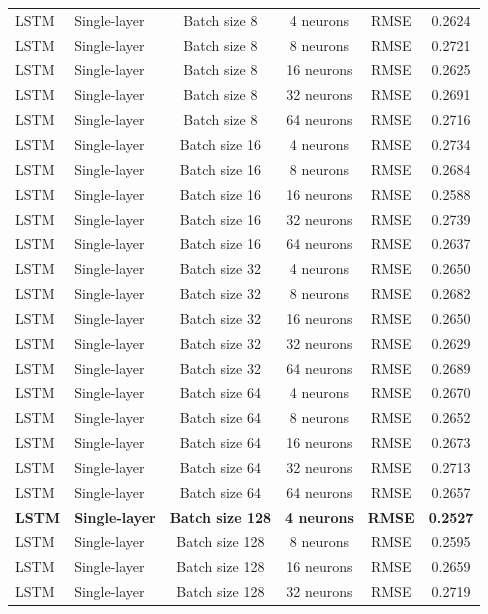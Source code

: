 \begin{landscape}
\begin{longtable}{llcccc}
LSTM & Single-layer & Batch size 8   & 4 neurons  & RMSE & 0.2624 \\
LSTM & Single-layer & Batch size 8   & 8 neurons  & RMSE & 0.2721 \\
LSTM & Single-layer & Batch size 8   & 16 neurons & RMSE & 0.2625 \\
LSTM & Single-layer & Batch size 8   & 32 neurons & RMSE & 0.2691 \\
LSTM & Single-layer & Batch size 8   & 64 neurons & RMSE & 0.2716 \\
LSTM & Single-layer & Batch size 16  & 4 neurons  & RMSE & 0.2734 \\
LSTM & Single-layer & Batch size 16  & 8 neurons  & RMSE & 0.2684 \\
LSTM & Single-layer & Batch size 16  & 16 neurons & RMSE & 0.2588 \\
LSTM & Single-layer & Batch size 16  & 32 neurons & RMSE & 0.2739 \\
LSTM & Single-layer & Batch size 16  & 64 neurons & RMSE & 0.2637 \\
LSTM & Single-layer & Batch size 32  & 4 neurons  & RMSE & 0.2650 \\
LSTM & Single-layer & Batch size 32  & 8 neurons  & RMSE & 0.2682 \\
LSTM & Single-layer & Batch size 32  & 16 neurons & RMSE & 0.2650 \\
LSTM & Single-layer & Batch size 32  & 32 neurons & RMSE & 0.2629 \\
LSTM & Single-layer & Batch size 32  & 64 neurons & RMSE & 0.2689 \\
LSTM & Single-layer & Batch size 64  & 4 neurons  & RMSE & 0.2670 \\
LSTM & Single-layer & Batch size 64  & 8 neurons  & RMSE & 0.2652 \\
LSTM & Single-layer & Batch size 64  & 16 neurons & RMSE & 0.2673 \\
LSTM & Single-layer & Batch size 64  & 32 neurons & RMSE & 0.2713 \\
LSTM & Single-layer & Batch size 64  & 64 neurons & RMSE & 0.2657 \\
\textbf{LSTM} & \textbf{Single-layer} & \textbf{Batch size 128} & \textbf{4 neurons}  & \textbf{RMSE} & \textbf{0.2527} \\
LSTM & Single-layer & Batch size 128 & 8 neurons  & RMSE & 0.2595 \\
LSTM & Single-layer & Batch size 128 & 16 neurons & RMSE & 0.2659 \\
LSTM & Single-layer & Batch size 128 & 32 neurons & RMSE & 0.2719 \\

\end{longtable}
\end{landscape}

